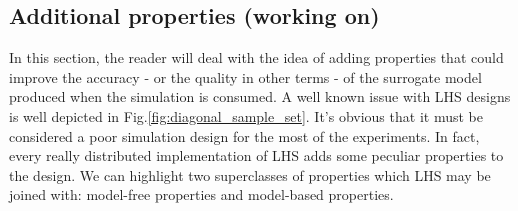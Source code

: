 \documentclass{article}
\newcommand{\mfigref}[1]{Fig.\ref{#1}}
\begin{document}
\subsection{Additional properties (working on)}
\label{subsec:lhs_properties}
In this section, the reader will deal with the idea of adding properties that could improve the accuracy - or the quality in other terms - of the surrogate model produced when the simulation is consumed.
A well known issue with LHS designs is well depicted in \mfigref{fig:diagonal_sample_set}. It's obvious that it must be considered a poor simulation design for the most of the experiments. In fact, every really distributed implementation of LHS adds some peculiar properties to the design. We can highlight two superclasses of properties which LHS may be joined with: model-free properties and model-based properties.
\end{document}
